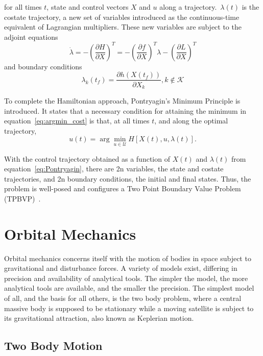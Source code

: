 for all times \(t\), state and control vectors \(X  \) and \(u\) along a trajectory.\ \( \lambda(t) \) is the costate trajectory, a new set of variables introduced as the continuous-time equivalent of Lagrangian multipliers. These new variables are subject to the adjoint equations
\begin{equation}
    \dot \lambda = - \left( \frac{\partial H}{\partial X} \right)^T = -\left( \frac{\partial f}{\partial X} \right)^T \lambda - \left( \frac{\partial L}{\partial X} \right)^T
\end{equation}
and boundary conditions~\cite{bryson_applied_optimal_control}
\begin{equation}
    \lambda_k(t_f) = \frac{\partial h(X(t_f))}{\partial X_k}, k \notin \mathcal{K}
\end{equation}

To complete the Hamiltonian approach, Pontryagin's Minimum Principle is introduced. It states that a necessary condition for attaining the minimum in equation~\eqref{eq:argmin_cost} is that, at all times \(t\), and along the optimal trajectory,
\begin{equation} \label{eq:Pontryagin}
    u(t) = \arg \min_{u \in \mathcal{U}} H[X(t), u, \lambda(t)].
\end{equation}

With the control trajectory obtained as a function of \(X(t)\) and \(\lambda(t)\) from equation~\eqref{eq:Pontryagin}, there are 2n variables, the state and costate trajectories, and 2n boundary conditions, the initial and final states. Thus, the problem is well-posed and configures a Two Point Boundary Value Problem (TPBVP)~\cite{bryson_applied_optimal_control}.

\section{Orbital Mechanics}

Orbital mechanics concerns itself with the motion of bodies in space subject to gravitational and disturbance forces. A variety of models exist, differing in precision and availability of analytical tools. The simpler the model, the more analytical tools are available, and the smaller the precision. The simplest model of all, and the basis for all others, is the two body problem, where a central massive body is supposed to be stationary while a moving satellite is subject to its gravitational attraction, also known as Keplerian motion. 

\subsection{Two Body Motion}

